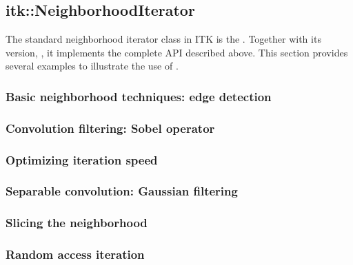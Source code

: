 {\subsection{itk::NeighborhoodIterator}
\label{sec:itkNeighborhoodIterator}

The standard neighborhood iterator class in ITK is the
.  Together with its  version,
, it implements the complete API
described above.  This section provides several examples to illustrate the use
of .

\subsubsection{Basic neighborhood techniques: edge detection}
\label{sec:NeighborhoodExample1}


\subsubsection{Convolution filtering: Sobel operator}
\label{sec:NeighborhoodExample2}


\subsubsection{Optimizing iteration speed}
\label{sec:NeighborhoodExample3}


\subsubsection{Separable convolution: Gaussian filtering}
\label{sec:NeighborhoodExample4}


\subsubsection{Slicing the neighborhood}
\label{sec:NeighborhoodExample5}


\subsubsection{Random access iteration}
\label{sec:NeighborhoodExample6}


}

